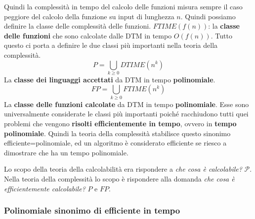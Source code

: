 \documentclass{article}
\begin{document}
Quindi la complessità in tempo del calcolo delle funzioni misura sempre il caso peggiore
del calcolo della funzione su input di lunghezza $n$. Quindi possiamo definire
la classe delle complessità delle funzioni.\newline\newline
$FTIME(f(n))$: la \textbf{classe delle funzioni} che sono calcolate dalle DTM in tempo $O(f(n))$. Tutto
questo ci porta a definire le due classi più importanti nella teoria della complessità.\mbox{}\newline
$$P=\bigcup_{k\geq 0}DTIME(n^k)$$
La \textbf{classe dei linguaggi accettati} da DTM in tempo \textbf{polinomiale}.
$$FP=\bigcup_{k\geq 0}FTIME(n^k)$$
La \textbf{classe delle funzioni calcolate} da DTM in tempo \textbf{polinomiale}.
Esse sono universalmente considerate le classi più importanti poiché
racchiudono tutti quei problemi che vengono \textbf{risolti efficientemente in tempo},
ovvero in \textbf{tempo polinomiale}. Quindi la teoria della complessità stabilisce
questo sinonimo efficiente=polinomiale, ed un algoritmo è considerato efficiente
se riesco a dimostrare che ha un tempo polinomiale.

Lo scopo della teoria della calcolabilità era rispondere a \textit{che cosa è calcolabile?}
$\mathcal{P}$. Nella teoria della complessità lo scopo è rispondere alla domanda
\textit{che cosa è efficientemente calcolabile?} $P$ e $FP$.

\subsubsection{Polinomiale sinonimo di efficiente in tempo}
\end{document}
